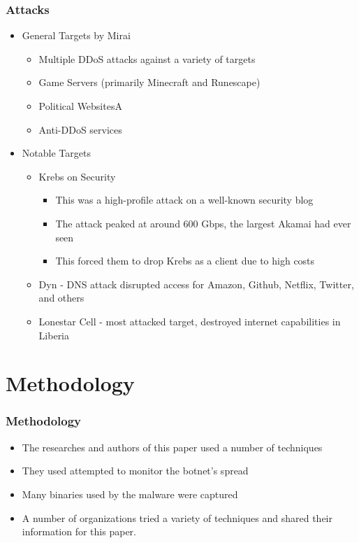 \documentclass{beamer}
\begin{document}
\begin{frame}
    \frametitle{Attacks}
	\begin{itemize}
		\item<+-> General Targets by Mirai
			\begin{itemize}
				\item<+-> Multiple DDoS attacks against a variety of targets
				\item<+-> Game Servers (primarily Minecraft and Runescape)
				\item<+-> Political WebsitesA
				\item<+-> Anti-DDoS services
			\end{itemize}
		\item<+-> Notable Targets
			\begin{itemize}
				\item<+-> Krebs on Security
				\begin{itemize}
					\item<+-> This was a high-profile attack on a well-known security blog
					\item<+-> The attack peaked at around 600 Gbps, the largest Akamai had ever seen 						\item<+-> This forced them to drop Krebs as a client due to high costs
				\end{itemize}
				\item<+-> Dyn - DNS attack disrupted access for Amazon, Github, Netflix, Twitter, and others
				\item<+-> Lonestar Cell - most attacked target, destroyed internet capabilities in Liberia
			\end{itemize}
	\end{itemize}
\end{frame}

\section{Methodology}

\begin{frame}
	\frametitle{Methodology}
	\begin{itemize}
		\item<+-> The researches and authors of this paper used a number of techniques
		\item<+-> They used attempted to monitor the botnet's spread
		\item<+-> Many binaries used by the malware were captured
		\item<+-> A number of organizations tried a variety of techniques and shared their information for this paper.
	\end{itemize}
\end{frame}
\end{document}
